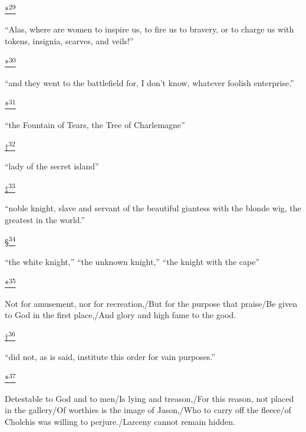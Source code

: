 \protect\hypertarget{23_NOTES.xhtmlux5cux23id_2520}{\protect\hyperlink{10_Chapter_Three__THE_HEROIC_DREAM.xhtmlux5cux23id_2519}{*\textsuperscript{29}}}
``Alas, where are women to inspire us, to fire us to bravery, or to
charge us with tokens, insignia, scarves, and veils!''

\protect\hypertarget{23_NOTES.xhtmlux5cux23id_2522}{\protect\hyperlink{10_Chapter_Three__THE_HEROIC_DREAM.xhtmlux5cux23id_2521}{*\textsuperscript{30}}}
``and they went to the battlefield for, I don't know, whatever foolish
enterprise.''

\protect\hypertarget{23_NOTES.xhtmlux5cux23id_2524}{\protect\hyperlink{10_Chapter_Three__THE_HEROIC_DREAM.xhtmlux5cux23id_2523}{*\textsuperscript{31}}}
``the Fountain of Tears, the Tree of Charlemagne''

\protect\hypertarget{23_NOTES.xhtmlux5cux23id_2525}{\protect\hyperlink{10_Chapter_Three__THE_HEROIC_DREAM.xhtmlux5cux23id_2526}{†\textsuperscript{32}}}
``lady of the secret island''

\protect\hypertarget{23_NOTES.xhtmlux5cux23id_2528}{\protect\hyperlink{10_Chapter_Three__THE_HEROIC_DREAM.xhtmlux5cux23id_2527}{‡\textsuperscript{33}}}
``noble knight, slave and servant of the beautiful giantess with the
blonde wig, the greatest in the world.''

\protect\hypertarget{23_NOTES.xhtmlux5cux23id_2530}{\protect\hyperlink{10_Chapter_Three__THE_HEROIC_DREAM.xhtmlux5cux23id_2529}{§\textsuperscript{34}}}
``the white knight,'' ``the unknown knight,'' ``the knight with the
cape''

\protect\hypertarget{23_NOTES.xhtmlux5cux23id_2532}{\protect\hyperlink{10_Chapter_Three__THE_HEROIC_DREAM.xhtmlux5cux23id_2531}{*\textsuperscript{35}}}
Not for amusement, nor for recreation,/But for the purpose that
praise/Be given to God in the first place,/And glory and high fame to
the good.

\protect\hypertarget{23_NOTES.xhtmlux5cux23id_2534}{\protect\hyperlink{10_Chapter_Three__THE_HEROIC_DREAM.xhtmlux5cux23id_2533}{†\textsuperscript{36}}}
``did not, as is said, institute this order for vain purposes.''

\protect\hypertarget{23_NOTES.xhtmlux5cux23id_2536}{\protect\hyperlink{10_Chapter_Three__THE_HEROIC_DREAM.xhtmlux5cux23id_2535}{*\textsuperscript{37}}}
Detestable to God and to men/Is lying and treason,/For this reason, not
placed in the gallery/Of worthies is the image of Jason,/Who to carry
off the fleece/of Cholchis was willing to perjure./Larceny cannot remain
hidden.

